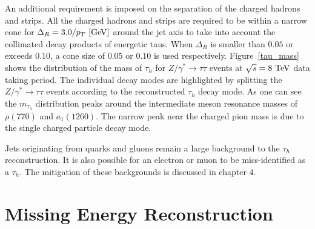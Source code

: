 An additional requirement is imposed on the separation of the charged hadrons and strips. All the charged hadrons and strips are required to be within a narrow cone for $\Delta_R = 3.0 /p _{T}~[\mathrm{Ge\kern -0.1em V}]$ around the jet axis to take into account the collimated decay products of energetic taus. When $\Delta_R$ is smaller than $0.05$ or exceeds $0.10$, a cone size of $0.05$ or $0.10$ is used respectively. Figure~\ref{tau_mass} shows the distribution of the mass of $\tau_{h}$ for $Z/\gamma^{*} \rightarrow \tau\tau$ events at $\sqrt{s}=8~\mathrm{Te\kern -0.1em V}$ data taking period. The individual decay modes are highlighted by splitting the $Z/\gamma^{*} \rightarrow \tau\tau$ events according to the reconstructed $\tau_{h}$ decay mode. As one can see the $m_{\tau_h}$ distribution peaks around the intermediate meson resonance masses of $\rho(770)$ and $a_{1}(1260)$. The narrow peak near the charged pion mass is due to the single charged particle decay mode. 

Jets originating from quarks and gluons remain a large background to the $\tau_{h}$ reconstruction. It is also possible for an electron or muon to be miss-identified as a $\tau_{h}$. The mitigation of these backgrounds is discussed in chapter $4$.
 
\section{Missing Energy Reconstruction}

